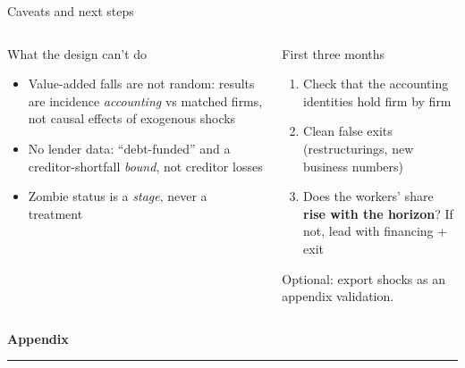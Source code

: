 \documentclass[aspectratio=169,11pt]{beamer}
\newcommand{\hl}[1]{{\color{WarmAmber}\bfseries #1}}
\newcommand{\muted}[1]{{\color{CoolGray}#1}}
\begin{document}
\begin{frame}{Caveats and next steps}
  \begin{columns}[T,onlytextwidth]
    \begin{cardbox}{What the design can't do}
      \begin{itemize}
        \item Value-added falls are \alert{not random}: results are incidence \emph{accounting} vs matched firms, not causal effects of exogenous shocks
        \item No lender data: ``debt-funded'' and a creditor-shortfall \emph{bound}, not creditor losses
        \item Zombie status is a \emph{stage}, never a treatment
      \end{itemize}
    \end{cardbox}
    \begin{cardbox}{First three months}
      \begin{enumerate}
        \item Check that the accounting identities hold firm by firm
        \item Clean false exits (restructurings, new business numbers)
        \item Does the workers' share \hl{rise with the horizon}? If not, lead with financing + exit
      \end{enumerate}
      \vspace{2pt}
      \muted{Optional: export shocks as an appendix validation.}
    \end{cardbox}
  \end{columns}
\end{frame}

\appendix
\begin{frame}[plain]
  \vfill
  \begin{center}
    {\Huge\bfseries\color{SlateTeal}Appendix\par}
    \vskip8pt
    {\color{WarmAmber}\rule{0.3\textwidth}{1.2pt}}
  \end{center}
  \vfill
\end{frame}
\end{document}
